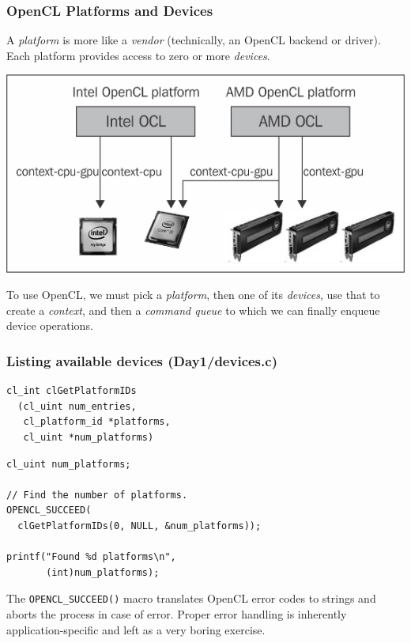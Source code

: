 \documentclass{beamer}
\begin{document}
\begin{frame}
  \frametitle{OpenCL Platforms and Devices}

  A \textit{platform} is more like a \textit{vendor} (technically, an
  OpenCL backend or driver).  Each platform provides access to zero or
  more \textit{devices}.

  \begin{center}
    \includegraphics[width=\textwidth]{img/opencl-platforms-devices.png}
  \end{center}

  To use OpenCL, we must pick a \textit{platform}, then one of its
  \textit{devices}, use that to create a \textit{context}, and then a
  \textit{command queue} to which we can finally enqueue device
  operations.
\end{frame}

\begin{frame}
  \frametitle{Listing available devices (Day1/devices.c)}

\begin{lstlisting}[backgroundcolor=\color{lightgray}]
cl_int clGetPlatformIDs
  (cl_uint num_entries,
   cl_platform_id *platforms,
   cl_uint *num_platforms)
\end{lstlisting}

\begin{lstlisting}
cl_uint num_platforms;

// Find the number of platforms.
OPENCL_SUCCEED(
  clGetPlatformIDs(0, NULL, &num_platforms));

printf("Found %d platforms\n",
       (int)num_platforms);
\end{lstlisting}

  The \texttt{OPENCL\_SUCCEED()} macro translates OpenCL error codes
  to strings and aborts the process in case of error.  Proper error
  handling is inherently application-specific and left as a very
  boring exercise.
\end{frame}
\end{document}
